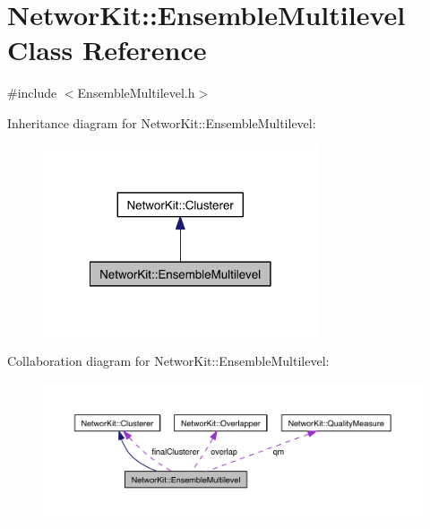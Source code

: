 \hypertarget{class_networ_kit_1_1_ensemble_multilevel}{\section{Networ\-Kit\-:\-:Ensemble\-Multilevel Class Reference}
\label{class_networ_kit_1_1_ensemble_multilevel}
}


{\ttfamily \#include $<$Ensemble\-Multilevel.\-h$>$}



Inheritance diagram for Networ\-Kit\-:\-:Ensemble\-Multilevel\-:\nopagebreak
\begin{figure}[H]
\begin{center}
\leavevmode
\includegraphics[width=230pt]{class_networ_kit_1_1_ensemble_multilevel__inherit__graph}
\end{center}
\end{figure}


Collaboration diagram for Networ\-Kit\-:\-:Ensemble\-Multilevel\-:\nopagebreak
\begin{figure}[H]
\begin{center}
\leavevmode
\includegraphics[width=350pt]{class_networ_kit_1_1_ensemble_multilevel__coll__graph}
\end{center}
\end{figure}
